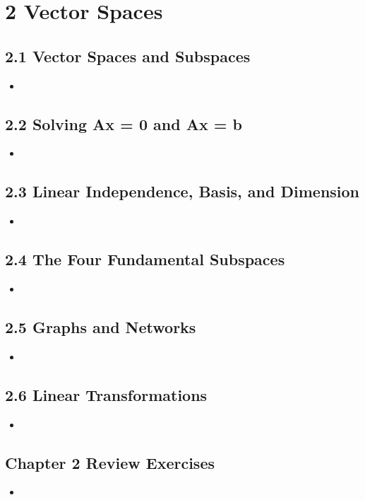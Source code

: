 \chapter{2 Vector Spaces}

\section{2.1 Vector Spaces and Subspaces}
\begin{itemize}
  \item []


\end{itemize}

\section{2.2 Solving Ax = 0 and Ax = b}
\begin{itemize}
  \item []


\end{itemize}

\section{2.3 Linear Independence, Basis, and Dimension}
\begin{itemize}
  \item []


\end{itemize}

\section{2.4 The Four Fundamental Subspaces}
\begin{itemize}
  \item []


\end{itemize}

\section{2.5 Graphs and Networks}
\begin{itemize}
  \item []


\end{itemize}

\section{2.6 Linear Transformations}
\begin{itemize}
  \item []


\end{itemize}

\section{Chapter 2 Review Exercises}
\begin{itemize}
  \item []


\end{itemize}


